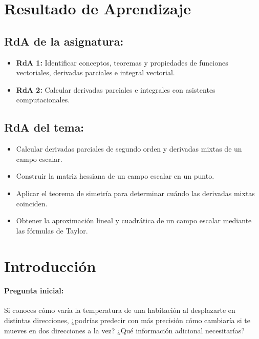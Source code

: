 \documentclass[a4,11pt]{aleph-notas}
\begin{document}
\encabezado

\section*{Resultado de Aprendizaje}

\subsection*{RdA de la asignatura:}
\begin{itemize}[leftmargin=*]
    \item \textbf{RdA 1:} Identificar conceptos, teoremas y propiedades de funciones vectoriales, derivadas parciales e integral vectorial.
    \item \textbf{RdA 2:} Calcular derivadas parciales e integrales con asistentes computacionales.
\end{itemize}

\subsection*{RdA del tema:}
\begin{itemize}[leftmargin=*]
    \item Calcular derivadas parciales de segundo orden y derivadas mixtas de un campo escalar.
    \item Construir la matriz hessiana de un campo escalar en un punto.
    \item Aplicar el teorema de simetría para determinar cuándo las derivadas mixtas coinciden.
    \item Obtener la aproximación lineal y cuadrática de un campo escalar mediante las fórmulas de Taylor.
\end{itemize}

\section*{Introducción}

\paragraph{Pregunta inicial:}
Si conoces cómo varía la temperatura de una habitación al desplazarte en distintas direcciones, ¿podrías predecir con más precisión cómo cambiaría si te mueves en dos direcciones a la vez? ¿Qué información adicional necesitarías?
\end{document}
